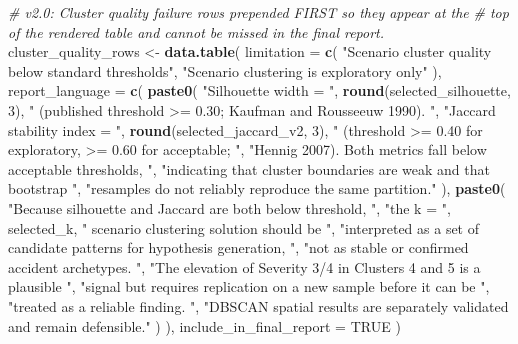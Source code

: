\documentclass[
]{article}
\newenvironment{Shaded}{\begin{snugshade}}{\end{snugshade}}
\newcommand{\AttributeTok}[1]{\textcolor[rgb]{0.13,0.29,0.53}{#1}}
\newcommand{\CommentTok}[1]{\textcolor[rgb]{0.56,0.35,0.01}{\textit{#1}}}
\newcommand{\ConstantTok}[1]{\textcolor[rgb]{0.56,0.35,0.01}{#1}}
\newcommand{\DecValTok}[1]{\textcolor[rgb]{0.00,0.00,0.81}{#1}}
\newcommand{\FunctionTok}[1]{\textcolor[rgb]{0.13,0.29,0.53}{\textbf{#1}}}
\newcommand{\NormalTok}[1]{#1}
\newcommand{\OtherTok}[1]{\textcolor[rgb]{0.56,0.35,0.01}{#1}}
\newcommand{\StringTok}[1]{\textcolor[rgb]{0.31,0.60,0.02}{#1}}
\begin{document}
\begin{Shaded}
\begin{Highlighting}[]
\CommentTok{\# v2.0: Cluster quality failure rows prepended FIRST so they appear at the}
\CommentTok{\# top of the rendered table and cannot be missed in the final report.}
\NormalTok{cluster\_quality\_rows }\OtherTok{\textless{}{-}} \FunctionTok{data.table}\NormalTok{(}
  \AttributeTok{limitation =} \FunctionTok{c}\NormalTok{(}
    \StringTok{"Scenario cluster quality below standard thresholds"}\NormalTok{,}
    \StringTok{"Scenario clustering is exploratory only"}
\NormalTok{  ),}
  \AttributeTok{report\_language =} \FunctionTok{c}\NormalTok{(}
    \FunctionTok{paste0}\NormalTok{(}
      \StringTok{"Silhouette width = "}\NormalTok{, }\FunctionTok{round}\NormalTok{(selected\_silhouette, }\DecValTok{3}\NormalTok{),}
      \StringTok{" (published threshold \textgreater{}= 0.30; Kaufman and Rousseeuw 1990). "}\NormalTok{,}
      \StringTok{"Jaccard stability index = "}\NormalTok{, }\FunctionTok{round}\NormalTok{(selected\_jaccard\_v2, }\DecValTok{3}\NormalTok{),}
      \StringTok{" (threshold \textgreater{}= 0.40 for exploratory, \textgreater{}= 0.60 for acceptable; "}\NormalTok{,}
      \StringTok{"Hennig 2007). Both metrics fall below acceptable thresholds, "}\NormalTok{,}
      \StringTok{"indicating that cluster boundaries are weak and that bootstrap "}\NormalTok{,}
      \StringTok{"resamples do not reliably reproduce the same partition."}
\NormalTok{    ),}
    \FunctionTok{paste0}\NormalTok{(}
      \StringTok{"Because silhouette and Jaccard are both below threshold, "}\NormalTok{,}
      \StringTok{"the k = "}\NormalTok{, selected\_k, }\StringTok{" scenario clustering solution should be "}\NormalTok{,}
      \StringTok{"interpreted as a set of candidate patterns for hypothesis generation, "}\NormalTok{,}
      \StringTok{"not as stable or confirmed accident archetypes. "}\NormalTok{,}
      \StringTok{"The elevation of Severity 3/4 in Clusters 4 and 5 is a plausible "}\NormalTok{,}
      \StringTok{"signal but requires replication on a new sample before it can be "}\NormalTok{,}
      \StringTok{"treated as a reliable finding. "}\NormalTok{,}
      \StringTok{"DBSCAN spatial results are separately validated and remain defensible."}
\NormalTok{    )}
\NormalTok{  ),}
  \AttributeTok{include\_in\_final\_report =} \ConstantTok{TRUE}
\NormalTok{)}


\end{Highlighting}
\end{Shaded}
\end{document}
